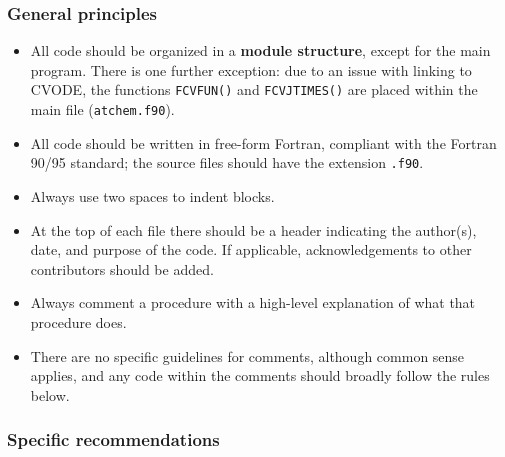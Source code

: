 \subsubsection{General principles}

\begin{itemize}
\item All code should be organized in a \textbf{module structure}, except for the main
  program. There is one further exception: due to an issue with linking to CVODE, the functions
  \texttt{FCVFUN()} and \texttt{FCVJTIMES()} are placed within the main file
  (\texttt{atchem.f90}).
\item All code should be written in free-form Fortran, compliant with the Fortran 90/95
  standard; the source files should have the extension \texttt{.f90}.
\item Always use two spaces to indent blocks.
\item At the top of each file there should be a header indicating the author(s), date, and
  purpose of the code. If applicable, acknowledgements to other contributors should be added.
\item Always comment a procedure with a high-level explanation of what that procedure does.
\item There are no specific guidelines for comments, although common sense applies, and any
  code within the comments should broadly follow the rules below.
\end{itemize}

\subsubsection{Specific recommendations}

